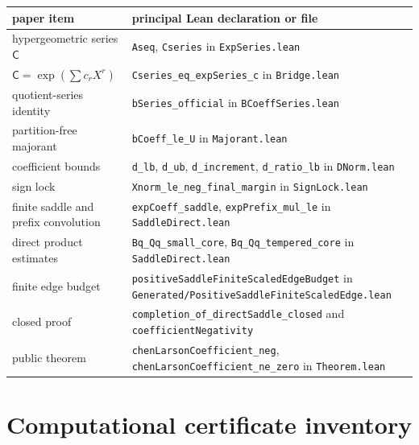 \documentclass[11pt]{article}
\theoremstyle{definition}
\theoremstyle{remark}
\newcommand{\C}{\mathsf C}
\newcommand{\code}[1]{\texttt{#1}}
\begin{document}
\begin{center}
\small
\begin{tabular}{p{}p{}}
\toprule
paper item & principal Lean declaration or file\\
\midrule
hypergeometric series $\C$ & \code{Aseq}, \code{Cseries} in
  \code{ExpSeries.lean}\\
$\C=\exp(\sum c_rX^r)$ & \code{Cseries\_eq\_expSeries\_c} in
  \code{Bridge.lean}\\
quotient-series identity & \code{bSeries\_official} in
  \code{BCoeffSeries.lean}\\
partition-free majorant & \code{bCoeff\_le\_U} in
  \code{Majorant.lean}\\
coefficient bounds & \code{d\_lb}, \code{d\_ub},
  \code{d\_increment}, \code{d\_ratio\_lb} in \code{DNorm.lean}\\
sign lock & \code{Xnorm\_le\_neg\_final\_margin} in
  \code{SignLock.lean}\\
finite saddle and prefix convolution & \code{expCoeff\_saddle},
  \code{expPrefix\_mul\_le} in \code{SaddleDirect.lean}\\
direct product estimates & \code{Bq\_Qq\_small\_core},
  \code{Bq\_Qq\_tempered\_core} in \code{SaddleDirect.lean}\\
finite edge budget & \code{positiveSaddleFiniteScaledEdgeBudget} in
  \code{Generated/PositiveSaddleFiniteScaledEdge.lean}\\
closed proof & \code{completion\_of\_directSaddle\_closed} and
  \code{coefficientNegativity}\\
public theorem & \code{chenLarsonCoefficient\_neg},
  \code{chenLarsonCoefficient\_ne\_zero} in \code{Theorem.lean}\\
\bottomrule
\end{tabular}
\end{center}

\section{Computational certificate inventory}\label{app:certs}
\end{document}
